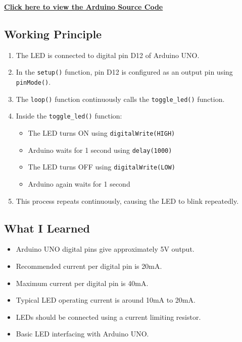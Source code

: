\href{https://github.com/YOUR_USERNAME/YOUR_REPOSITORY/blob/main/Exp-0/led_flash/led_flash.ino}
{\textbf{Click here to view the Arduino Source Code}}


\subsection{Working Principle}

\begin{enumerate}
    \item The LED is connected to digital pin D12 of Arduino UNO.

    \item In the \texttt{setup()} function, pin D12 is configured as an output pin using \texttt{pinMode()}.

    \item The \texttt{loop()} function continuously calls the \texttt{toggle\_led()} function.

    \item Inside the \texttt{toggle\_led()} function:
    \begin{itemize}
        \item The LED turns ON using \texttt{digitalWrite(HIGH)}
        \item Arduino waits for 1 second using \texttt{delay(1000)}
        \item The LED turns OFF using \texttt{digitalWrite(LOW)}
        \item Arduino again waits for 1 second
    \end{itemize}

    \item This process repeats continuously, causing the LED to blink repeatedly.
\end{enumerate}


\subsection{What I Learned}

\begin{itemize}
    \item Arduino UNO digital pins give approximately 5V output.
    \item Recommended current per digital pin is 20mA.
    \item Maximum current per digital pin is 40mA.
    \item Typical LED operating current is around 10mA to 20mA.
    \item LEDs should be connected using a current limiting resistor.
    \item Basic LED interfacing with Arduino UNO.
\end{itemize}

